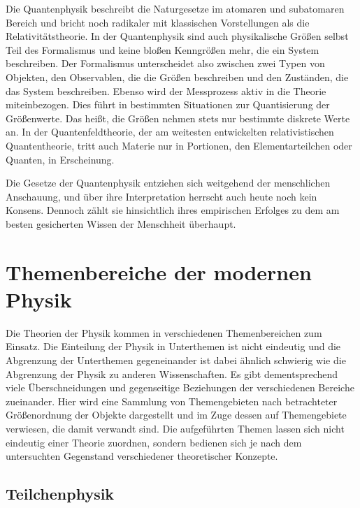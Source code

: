 \documentclass[titlepage, parkskip=full, twocolumn, landscape]{scrartcl}
\begin{document}
Die Quantenphysik beschreibt die Naturgesetze im atomaren und subatomaren Bereich und bricht noch radikaler mit klassischen Vorstellungen als die Relativitätstheorie. In der Quantenphysik sind auch physikalische Größen selbst Teil des Formalismus und keine bloßen Kenngrößen mehr, die ein System beschreiben. Der Formalismus unterscheidet also zwischen zwei Typen von Objekten, den Observablen, die die Größen beschreiben und den Zuständen, die das System beschreiben. Ebenso wird der Messprozess aktiv in die Theorie miteinbezogen. Dies führt in bestimmten Situationen zur Quantisierung der Größenwerte. Das heißt, die Größen nehmen stets nur bestimmte diskrete Werte an. In der Quantenfeldtheorie, der am weitesten entwickelten relativistischen Quantentheorie, tritt auch Materie nur in Portionen, den Elementarteilchen oder Quanten, in Erscheinung.

Die Gesetze der Quantenphysik entziehen sich weitgehend der menschlichen Anschauung, und über ihre Interpretation herrscht auch heute noch kein Konsens. Dennoch zählt sie hinsichtlich ihres empirischen Erfolges zu dem am besten gesicherten Wissen der Menschheit überhaupt.

\section{Themenbereiche der modernen Physik}

Die Theorien der Physik kommen in verschiedenen Themenbereichen zum Einsatz. Die Einteilung der Physik in Unterthemen ist nicht eindeutig und die Abgrenzung der Unterthemen gegeneinander ist dabei ähnlich schwierig wie die Abgrenzung der Physik zu anderen Wissenschaften. Es gibt dementsprechend viele Überschneidungen und gegenseitige Beziehungen der verschiedenen Bereiche zueinander. Hier wird eine Sammlung von Themengebieten nach betrachteter Größenordnung der Objekte dargestellt und im Zuge dessen auf Themengebiete verwiesen, die damit verwandt sind. Die aufgeführten Themen lassen sich nicht eindeutig einer Theorie zuordnen, sondern bedienen sich je nach dem untersuchten Gegenstand verschiedener theoretischer Konzepte.

\subsection{Teilchenphysik}
\end{document}
